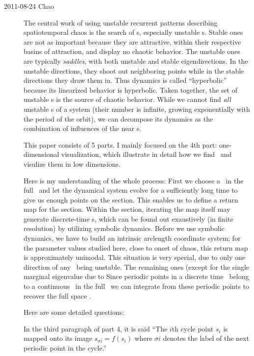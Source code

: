 \begin{description}

\item[2011-08-24 Chao]
The central work of using unstable recurrent patterns describing spatiotemporal chaos is the search of \po s, especially unstable \po s. Stable ones are not as important because they are attractive, within their respective basins of attraction,
and display no chaotic behavior.
The unstable ones are typically \emph{saddles}, with both unstable and stable eigendirections. In the unstable directions, they shoot out neighboring points while in the stable directions
they draw them in. Thus dynamics is called ``hyperbolic'' because its linearized behavior is hyperbolic. Taken together, the set of unstable \po s is the source of chaotic behavior.
While we cannot find \emph{all} unstable \po s of a system
(their number is infinite, growing exponentially
with the period of the orbit), we can decompose its dynamics as the combination of influences of the near \po s.

This paper consists of 5 parts. I mainly focused on the 4th part: one-dimensional visualization, which illustrate in detail how we find \po\  and visulize them in low dimensions.

Here is my understanding of the whole process: First we choose a \PoincSec\
in the full \statesp\ and let the dynamical system evolve for a sufficiently long time to give us enough points on the section. This enables us to define a return map for the section. Within the section, iterating the map itself may generate discrete-time \po s, which can be found out exaustively
(in finite resolution) by utilizing symbolic dynamics. Before we use symbolic dynamics, we have to build an intrinsic arclength coordinate system; for
the parameter values studied here, close to onset of chaos, this return map
is approximately unimodal. This situation is very special, due to only one direction
of any \po\ being unstable. The remaining ones (except for the single marginal
eigenvalue due to Since periodic points in a discrete time \po\ belong to a continuous \po\  in the full \statesp\, we can integrate from these periodic points to recover the full space \po.

Here are some detailed questions:

In the third paragraph of part 4, it is said
``The $i$th cycle point  $s_i$ is mapped onto its image $s_{\sigma i} = f(s_i)$ where $\sigma i$ denotes  the label of the next periodic point in the cycle.''



\end{description}
